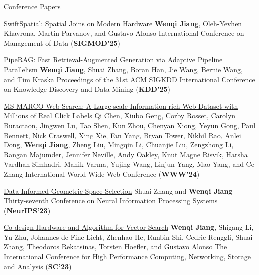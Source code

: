 \begin{rSection}{Conference Papers}
\begin{enumerate}[label={[\arabic*]}]
\item
\begin{Pub}{\href{https://arxiv.org/pdf/2309.16520.pdf}{SwiftSpatial: Spatial Joins on Modern Hardware}}
{\textbf{Wenqi Jiang}, Oleh-Yevhen Khavrona, Martin Parvanov, and Gustavo Alonso}
{International Conference on Management of Data (\textbf{SIGMOD'25})}
\end{Pub}

\item
\begin{Pub}{\href{https://arxiv.org/abs/2403.05676}{PipeRAG: Fast Retrieval-Augmented Generation via Adaptive Pipeline Parallelism}}
{\textbf{Wenqi Jiang}, Shuai Zhang, Boran Han, Jie Wang, Bernie Wang, and Tim Kraska}
{Proceedings of the 31st ACM SIGKDD International Conference on Knowledge Discovery and Data Mining (\textbf{KDD'25})}
\end{Pub}

\item
\begin{Pub}{\href{https://arxiv.org/abs/2405.07526}{MS MARCO Web Search: A Large-scale Information-rich Web Dataset with Millions of Real Click Labels}}
{Qi Chen, Xiubo Geng, Corby Rosset, Carolyn Buractaon, Jingwen Lu, Tao Shen, Kun Zhou, Chenyan Xiong, Yeyun Gong, Paul Bennett, Nick Craswell, Xing Xie, Fan Yang, Bryan Tower, Nikhil Rao, Anlei Dong, \textbf{Wenqi Jiang}, Zheng Liu, Mingqin Li, Chuanjie Liu, Zengzhong Li, Rangan Majumder, Jennifer Neville, Andy Oakley, Knut Magne Risvik, Harsha Vardhan Simhadri, Manik Varma, Yujing Wang, Linjun Yang, Mao Yang, and Ce Zhang}
{International World Wide Web Conference (\textbf{WWW'24})}
\end{Pub}

\item
\begin{Pub}{\href{https://proceedings.neurips.cc/paper_files/paper/2023/file/486ff0b164cf92b0255fe39863bcf99e-Paper-Conference.pdf}{Data-Informed Geometric Space Selection}}
{Shuai Zhang and \textbf{Wenqi Jiang}}
{Thirty-seventh Conference on Neural Information Processing Systems (\textbf{NeurIPS'23})}
\end{Pub}

\item
\begin{Pub}{\href{https://arxiv.org/pdf/2306.11182.pdf}{Co-design Hardware and Algorithm for Vector Search}}
{\textbf{Wenqi Jiang}, Shigang Li, Yu Zhu, Johannes de Fine Licht, Zhenhao He, Runbin Shi, Cedric Renggli, Shuai Zhang, Theodoros Rekatsinas, Torsten Hoefler, and Gustavo Alonso}
{The International Conference for High Performance Computing, Networking, Storage and Analysis (\textbf{SC'23})}
\end{Pub}


\end{enumerate}
\end{rSection}
